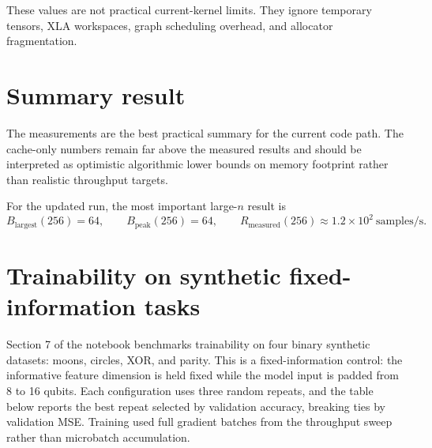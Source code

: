 \documentclass[11pt]{article}
\begin{document}
These values are not practical current-kernel limits. They ignore temporary
tensors, XLA workspaces, graph scheduling overhead, and allocator fragmentation.

\section*{Summary result}

\begin{table}[h]
\centering
{}
\end{table}

The measurements are the best practical summary for the current code path. The
cache-only numbers remain far above the measured results and should be
interpreted as optimistic algorithmic lower bounds on memory footprint rather
than realistic throughput targets.

For the updated run, the most important large-\(n\) result is
\[
  \boxed{B_{\mathrm{largest}}(256)=64,\qquad B_{\mathrm{peak}}(256)=64,\qquad R_{\mathrm{measured}}(256)\approx 1.2\times 10^2\ \mathrm{samples/s}.}
\]

\section*{Trainability on synthetic fixed-information tasks}

Section 7 of the notebook benchmarks trainability on four binary synthetic
datasets: moons, circles, XOR, and parity. This is a fixed-information control:
the informative feature dimension is held fixed while the model input is padded
from 8 to 16 qubits. Each configuration uses three random repeats, and the table
below reports the best repeat selected by validation accuracy, breaking ties by
validation MSE. Training used full gradient batches from the throughput sweep
rather than microbatch accumulation.
\end{document}

